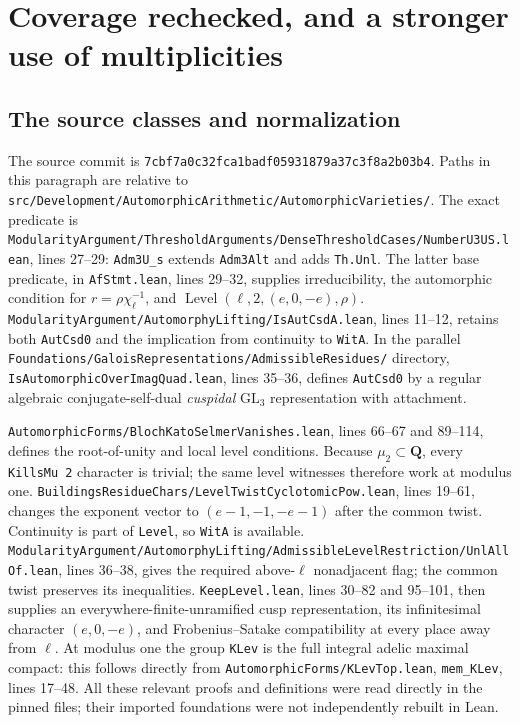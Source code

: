 \section{Coverage rechecked, and a stronger use of multiplicities}
\label{sec:kt-coverage}

\subsection{The source classes and normalization}
The source commit is
\texttt{7cbf7a0c32fca1badf05931879a37c3f8a2b03b4}.
Paths in this paragraph are relative to
\texttt{src/Development/AutomorphicArithmetic/AutomorphicVarieties/}.
The exact predicate is
\texttt{ModularityArgument/ThresholdArguments/DenseThresholdCases/NumberU3US.lean},
lines 27--29: \texttt{Adm3U\_s} extends \texttt{Adm3Alt} and adds
\texttt{Th.Unl}. The latter base predicate, in \texttt{AfStmt.lean},
lines 29--32, supplies irreducibility, the automorphic condition for
$r=\rho\chi_\ell^{-1}$, and
$\operatorname{Level}(\ell,2,(e,0,-e),\rho)$.
\texttt{ModularityArgument/AutomorphyLifting/IsAutCsdA.lean},
lines 11--12, retains both \texttt{AutCsd0} and the implication
from continuity to \texttt{WitA}.
In the parallel \texttt{Foundations/GaloisRepresentations/AdmissibleResidues/}
directory, \texttt{IsAutomorphicOverImagQuad.lean}, lines 35--36,
defines \texttt{AutCsd0} by a regular algebraic conjugate-self-dual
\emph{cuspidal} $\mathrm{GL}_3$ representation with attachment.

\texttt{AutomorphicForms/BlochKatoSelmerVanishes.lean},
lines 66--67 and 89--114, defines the root-of-unity and local
level conditions. Because $\mu_2\subset\mathbf Q$, every
\texttt{KillsMu 2} character is trivial; the same level witnesses
therefore work at modulus one.
\texttt{BuildingsResidueChars/LevelTwistCyclotomicPow.lean},
lines 19--61, changes the exponent vector to
$(e-1,-1,-e-1)$ after the common twist.
Continuity is part of \texttt{Level}, so \texttt{WitA} is available.
\texttt{ModularityArgument/AutomorphyLifting/AdmissibleLevelRestriction/UnlAllOf.lean},
lines 36--38, gives the required above-$\ell$ nonadjacent flag;
the common twist preserves its inequalities.
\texttt{KeepLevel.lean}, lines 30--82 and 95--101, then supplies
an everywhere-finite-unramified cusp representation, its infinitesimal
character $(e,0,-e)$, and Frobenius--Satake compatibility at every
place away from $\ell$.
At modulus one the group \texttt{KLev} is the full integral adelic
maximal compact: this follows directly from
\texttt{AutomorphicForms/KLevTop.lean}, \texttt{mem\_KLev},
lines 17--48. All these relevant proofs and definitions were read
directly in the pinned files; their imported foundations were not
independently rebuilt in Lean.

